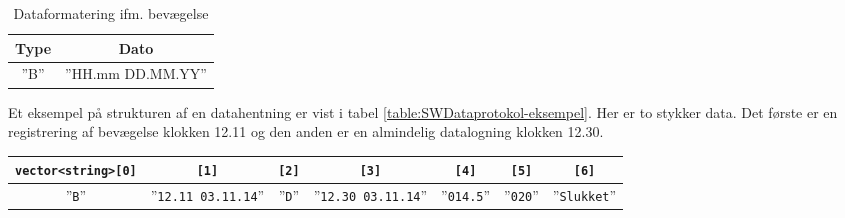 \begin{table}[h]
	\caption{Dataformatering ifm. bevægelse}
	\centering
	\begin{tabular}{|c|c|}
		\hline 
		\textbf{Type} & \textbf{Dato} \\ 
		\hline 
		''B'' & ''HH.mm DD.MM.YY'' \\ 
		\hline 
	\end{tabular} 
	\label{table:SWDataprotokol-bevaegelse}
\end{table}

Et eksempel på strukturen af en datahentning er vist i tabel \ref{table:SWDataprotokol-eksempel}. Her er to stykker data. Det første er en registrering af bevægelse klokken 12.11 og den anden er en almindelig datalogning klokken 12.30.

\begin{sidewaystable}[h]
	\caption{Dataformatering ifm. log-information}
	\centering
	\begin{tabular}{|c|c|c|c|c|c|c|}
		\hline
		\verb+vector<string>[0]+ & \verb+[1]+ & \verb+[2]+ & \verb+[3]+ & \verb+[4]+ & \verb+[5]+ & \verb+[6]+ \\
		\hline 
		''\verb+B+'' & ''\verb+12.11 03.11.14+'' & ''\verb+D+'' & ''\verb+12.30 03.11.14+'' & ''\verb+014.5+'' & ''\verb+020+'' & ''\verb+Slukket+'' \\ 
		\hline 
	\end{tabular} 
	\label{table:SWDataprotokol-eksempel}
\end{sidewaystable}